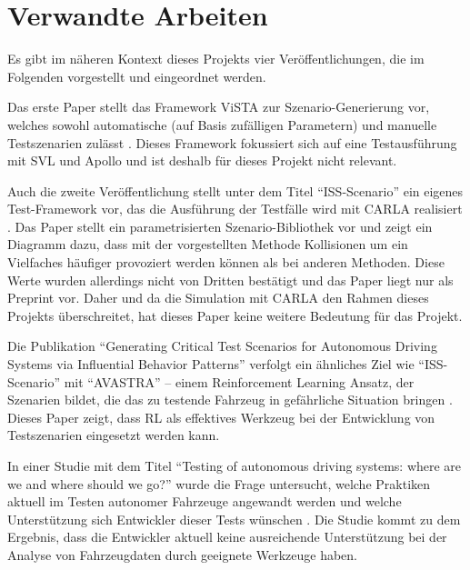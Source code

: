 \chapter{Verwandte Arbeiten}

Es gibt im näheren Kontext dieses Projekts vier Veröffentlichungen, die im Folgenden vorgestellt und eingeordnet werden.

Das erste Paper stellt das Framework ViSTA zur Szenario-Generierung vor, welches sowohl automatische (auf Basis zufälligen Parametern) und manuelle Testszenarien zulässt \cite{ViSTA}. Dieses Framework fokussiert sich auf eine Testausführung mit SVL und Apollo und ist deshalb für dieses Projekt nicht relevant.

Auch die zweite Veröffentlichung stellt unter dem Titel \enquote{ISS-Scenario} ein eigenes Test-Framework vor, das die Ausführung der Testfälle wird mit CARLA realisiert \cite{li2024issscenarioscenariobasedtestingcarla}. Das Paper stellt ein parametrisierten Szenario-Bibliothek vor und zeigt ein Diagramm dazu, dass mit der vorgestellten Methode Kollisionen um ein Vielfaches häufiger provoziert werden können als bei anderen Methoden. Diese Werte wurden allerdings nicht von Dritten bestätigt und das Paper liegt nur als Preprint vor. Daher und da die Simulation mit CARLA den Rahmen dieses Projekts überschreitet, hat dieses Paper keine weitere Bedeutung für das Projekt.

Die Publikation \enquote{Generating Critical Test Scenarios for Autonomous Driving Systems via Influential Behavior Patterns} verfolgt ein ähnliches Ziel wie \enquote{ISS-Scenario} mit \enquote{AVASTRA} -- einem Reinforcement Learning Ansatz, der Szenarien bildet, die das zu testende Fahrzeug in gefährliche Situation bringen \cite{GeneratingCritialTestScenarios}. Dieses Paper zeigt, dass RL als effektives Werkzeug bei der Entwicklung von Testszenarien eingesetzt werden kann.

In einer Studie mit dem Titel \enquote{Testing of autonomous driving systems: where are we and where should we go?} wurde die Frage untersucht, welche Praktiken aktuell im Testen autonomer Fahrzeuge angewandt werden und welche Unterstützung sich Entwickler dieser Tests wünschen \cite{WhereShouldWeGo}. Die Studie kommt zu dem Ergebnis, dass die Entwickler aktuell keine ausreichende Unterstützung bei der Analyse von Fahrzeugdaten durch geeignete Werkzeuge haben.
